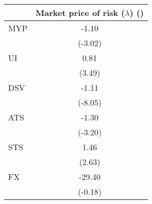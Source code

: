 \begin{tabular}{l*{1}{c}}
\hline
\hline
& Market price of risk ($\lambda$) (\times 100)\\
\hline
MYP & -1.10\\
   & (-3.02)\\
UI & 0.81\\
   & (3.49)\\
DSV & -1.11\\
   & (-8.05)\\
ATS & -1.30\\
   & (-3.20)\\
STS & 1.46\\
   & (2.63)\\
FX & -29.40\\
   & (-0.18)\\
\hline
\hline
\end{tabular}
